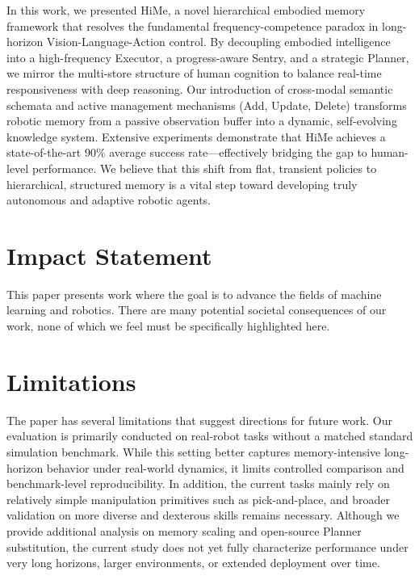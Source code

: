 \documentclass{article}
\theoremstyle{plain}
\theoremstyle{definition}
\theoremstyle{remark}
\begin{document}
In this work, we presented HiMe, a novel hierarchical embodied memory framework that resolves the fundamental frequency-competence paradox in long-horizon Vision-Language-Action control. By decoupling embodied intelligence into a high-frequency Executor, a progress-aware Sentry, and a strategic Planner, we mirror the multi-store structure of human cognition to balance real-time responsiveness with deep reasoning. Our introduction of cross-modal semantic schemata and active management mechanisms (Add, Update, Delete) transforms robotic memory from a passive observation buffer into a dynamic, self-evolving knowledge system. Extensive experiments demonstrate that HiMe achieves a state-of-the-art 90\% average success rate—effectively bridging the gap to human-level performance. 
We believe that this shift from flat, transient policies to hierarchical, structured memory is a vital step toward developing truly autonomous and adaptive robotic agents.


\section*{Impact Statement}

This paper presents work where the goal is to advance the fields of machine learning and robotics. There are many potential societal consequences of our work, none of which we feel must be specifically highlighted here.

\section*{Limitations}

The paper has several limitations that suggest directions for future work. Our evaluation is primarily conducted on real-robot tasks without a matched standard simulation benchmark. While this setting better captures memory-intensive long-horizon behavior under real-world dynamics, it limits controlled comparison and benchmark-level reproducibility. In addition, the current tasks mainly rely on relatively simple manipulation primitives such as pick-and-place, and broader validation on more diverse and dexterous skills remains necessary. Although we provide additional analysis on memory scaling and open-source Planner substitution, the current study does not yet fully characterize performance under very long horizons, larger environments, or extended deployment over time.
\nocite{langley00}
\end{document}
